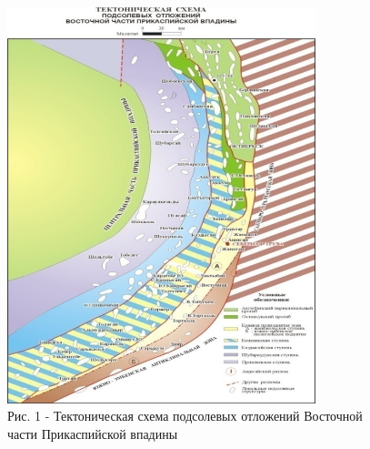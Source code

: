 \begin{figure}[H]
	\centering
	\includegraphics[width=0.8\textwidth]{assets/301}
	\caption*{Рис. 1 - Тектоническая схема подсолевых отложений Восточной
части Прикаспийской впадины}
\end{figure}

